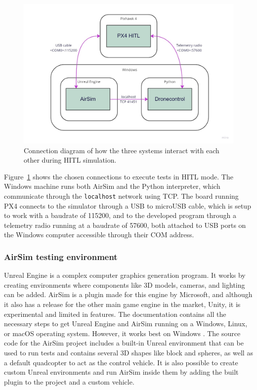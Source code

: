 \begin{figure}
  \centering
  \includegraphics[width=\textwidth,keepaspectratio]{img/hitl-connections.jpg}
  \caption{Connection diagram of how the three systems interact with each other during HITL simulation.}\label{fig:hitl-connections}
\end{figure}

Figure~\ref{fig:hitl-connections} shows the chosen connections to execute tests in HITL mode.
The Windows machine runs both AirSim and the Python interpreter, which communicate through the \texttt{localhost} network using TCP.
The board running PX4 connects to the simulator through a USB to microUSB cable, which is setup to work with a baudrate of 115200, and to the developed program through a telemetry radio running at a baudrate of 57600, both attached to USB ports on the Windows computer accessible through their COM address.

\subsubsection{AirSim testing environment}

Unreal Engine is a complex computer graphics generation program.
It works by creating environments where components like 3D models, cameras, and lighting can be added.
AirSim is a plugin made for this engine by Microsoft, and although it also has a release for the other main game engine in the market, Unity, it is experimental and limited in features.
The documentation contains all the necessary steps to get Unreal Engine and AirSim running on a Windows, Linux, or macOS operating system. 
However, it works best on Windows \cite{build-airsim}.
The source code for the AirSim project includes a built-in Unreal environment that can be used to run tests and contains several 3D shapes like block and spheres, as well as a default quadcopter to act as the control vehicle.
It is also possible to create custom Unreal environments and run AirSim inside them by adding the built plugin to the project and a custom vehicle.


